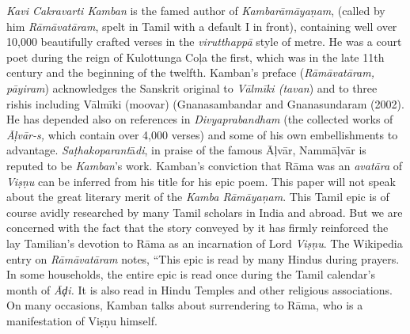 \item \textit{Kavi Cakravarti Kamban} is the famed author of \textit{Kambarāmāyaṇam}, (called by him \textit{Rāmāvatāram}, spelt in Tamil with a default I in front), containing well over 10,000 beautifully crafted verses in the \textit{virutthappā} style of metre. He was a court poet during the reign of Kulottunga Coļa the first, which was in the late 11th century and the beginning of the twelfth. Kamban’s preface (\textit{Rāmāvatāram, pāyiram}) acknowledges the Sanskrit original to \textit{Vālmīki (tavan}) and to three rishis including Vālmīki (moovar) (Gnanasambandar and Gnanasundaram (2002). He has depended also on references in \textit{Divyaprabandham} (the collected works of \textit{Āļvār-s,} which contain over 4,000 verses) and some of his own embellishments to advantage. \textit{Saṭhakoparant}ā\textit{di}, in praise of the famous Āļvār, Nammāļvār is reputed to be \textit{Kamban}’s work. Kamban’s conviction that Rāma was an \textit{avatāra} of \textit{Viṣṇu} can be inferred from his title for his epic poem. This paper will not speak about the great literary merit of the \textit{Kamba Rāmāyaņam}. This Tamil epic is of course avidly researched by many Tamil scholars in India and abroad. But we are concerned with the fact that the story conveyed by it has firmly reinforced the lay Tamilian’s devotion to Rāma as an incarnation of Lord \textit{Viṣṇu}. The Wikipedia entry on \textit{Rāmāvatāram} notes, “This epic is read by many Hindus during prayers. In some households, the entire epic is read once during the Tamil calendar's month of \textit{Āḑi.} It is also read in Hindu Temples and other religious associations. On many occasions, Kamban talks about surrendering to Rāma, who is a manifestation of Viṣṇu himself.

